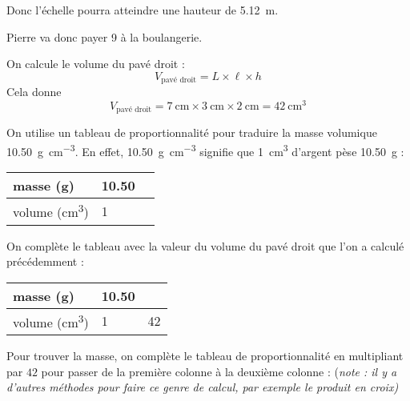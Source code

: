 \documentclass[addpoints,12pt]{exam}
\begin{document}
\begin{questions}
\begin{parts}
        Donc l'échelle pourra atteindre une hauteur de \qty{5,12}{\metre}.
    \end{parts}

    \question 
    Pierre va donc payer \qty{9}{\EURO} à la boulangerie.

    \question 
    On calcule le volume du pavé droit : 
    $$V_{\mbox{pavé droit}} = L \times \ell \times h$$
    Cela donne 
    $$V_{\mbox{pavé droit}} = \qty{7}{\cm} \times \qty{3}{\cm} \times \qty{2}{\cm} = \qty{42}{\cm\cubed}$$

    On utilise un tableau de proportionnalité pour traduire la masse volumique \qty{10,50}{\g\per\cm\cubed}. En effet, \qty{10,50}{\g\per\cm\cubed} signifie que \qty{1}{\cm\cubed} d'argent pèse \qty{10,50}{\g} :

    \begin{center}
    \begin{tabularx}{0.4\linewidth}{|l|X|X|}\hline
        masse (\unit{\g}) & \num{10,50} & \\\hline
        volume (\unit{\cm\cubed}) & \num{1} & \\\hline
    \end{tabularx}
    \end{center}

    On complète le tableau avec la valeur du volume du pavé droit que l'on a calculé précédemment :
    
    \begin{center}
    \begin{tabularx}{0.4\linewidth}{|l|X|X|}\hline
        masse (\unit{\g}) & \num{10,50} & \\\hline
        volume (\unit{\cm\cubed}) & \num{1} & \num{42} \\\hline
    \end{tabularx}
    \end{center}

    Pour trouver la masse, on complète le tableau de proportionnalité en multipliant par $42$ pour passer de la première colonne à la deuxième colonne : (\textit{note : il y a d'autres méthodes pour faire ce genre de calcul, par exemple le produit en croix)}


\end{questions}
\end{document}
